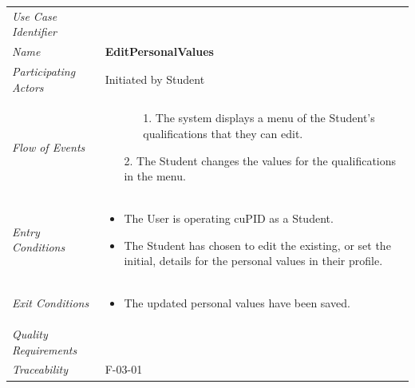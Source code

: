 \documentclass[12pt,letterpaper]{article}
\begin{document}
\begin{center}
	\begin{tabu} to 
		\toprule
		Use Case Identifier & \editpersonalvalues{} \\
		Name & {\bf EditPersonalValues} \\
		Participating Actors & Initiated by Student \\
		Flow of Events & 
		\begin{minipage}[t]{\linewidth}
		    \begin{enumerate}
		        \item[]
		        \begin{enumerate}
				    \item[1.] The system displays a menu of the Student's qualifications that they can edit.
		        \end{enumerate}
	            \item[2.] The Student changes the values for the qualifications in the menu.
			\end{enumerate}
		\end{minipage} \\

		Entry Conditions &
		\begin{minipage}[t]{\linewidth}
			\begin{itemize}
			    \item The User is operating cuPID as a Student.
			    \item The Student has chosen to edit the existing, or set the initial, details for the personal values in their profile.
	        \end{itemize}
		\end{minipage} \\

		Exit Conditions &
		\begin{minipage}[t]{\linewidth}
			\begin{itemize}
			    \item The updated personal values have been saved.
	        \end{itemize}
		\end{minipage} \\

		Quality Requirements & \\

		Traceability &  F-03-01\\
		\toprule
	\end{tabu}
\end{center}
\end{document}
